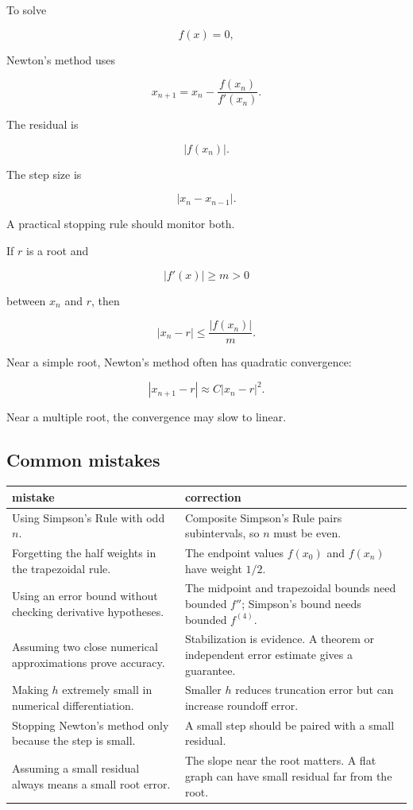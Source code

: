 To solve

\[
f(x)=0,
\]

Newton's method uses

\[
\boxed{
x_{n+1}=x_n-\frac{f(x_n)}{f'(x_n)}.
}
\]

The residual is

\[
|f(x_n)|.
\]

The step size is

\[
|x_n-x_{n-1}|.
\]

A practical stopping rule should monitor both.

If \(r\) is a root and

\[
|f'(x)|\ge m>0
\]

between \(x_n\) and \(r\), then

\[
\boxed{
|x_n-r|\le \frac{|f(x_n)|}{m}.
}
\]

Near a simple root, Newton's method often has quadratic convergence:

\[
|x_{n+1}-r|\approx C|x_n-r|^2.
\]

Near a multiple root, the convergence may slow to linear.

\subsection{Common mistakes}
\label{subsec:chapter-12-common-mistakes}

\begin{center}
\renewcommand{\arraystretch}{1.35}
\begin{tabular}{p{}|p{}}
\textbf{mistake} & \textbf{correction} \\ \hline
Using Simpson's Rule with odd \(n\). & Composite Simpson's Rule pairs subintervals, so \(n\) must be even. \\ \hline
Forgetting the half weights in the trapezoidal rule. & The endpoint values \(f(x_0)\) and \(f(x_n)\) have weight \(1/2\). \\ \hline
Using an error bound without checking derivative hypotheses. & The midpoint and trapezoidal bounds need bounded \(f''\); Simpson's bound needs bounded \(f^{(4)}\). \\ \hline
Assuming two close numerical approximations prove accuracy. & Stabilization is evidence.  A theorem or independent error estimate gives a guarantee. \\ \hline
Making \(h\) extremely small in numerical differentiation. & Smaller \(h\) reduces truncation error but can increase roundoff error. \\ \hline
Stopping Newton's method only because the step is small. & A small step should be paired with a small residual. \\ \hline
Assuming a small residual always means a small root error. & The slope near the root matters.  A flat graph can have small residual far from the root.
\end{tabular}
\end{center}


